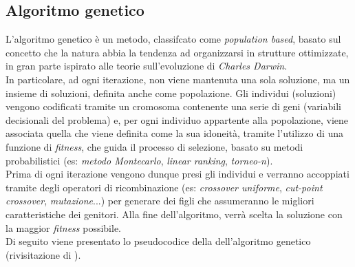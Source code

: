 \subsection{Algoritmo genetico}
\noindent L'algoritmo genetico \cite{site:dispense-de-giovanni} è un metodo, classifcato come \textit{population based}, basato sul concetto che la natura
abbia la tendenza ad organizzarsi in strutture ottimizzate, in gran parte ispirato
alle teorie sull'evoluzione di \textit{Charles Darwin}.\\
\noindent In particolare, ad ogni iterazione, non viene mantenuta una sola soluzione, ma un insieme di soluzioni, definita anche come popolazione.
Gli individui (soluzioni) vengono codificati tramite un cromosoma contenente una serie di geni (variabili decisionali del problema) e, per
ogni individuo appartente alla popolazione, viene associata quella che viene definita come la sua idoneità, tramite l'utilizzo di una
funzione di \textit{fitness}, che guida il processo di selezione, basato su metodi probabilistici (es: \textit{metodo Montecarlo}, \textit{linear ranking}, \textit{torneo-n}).\\
Prima di ogni iterazione vengono dunque presi gli individui e verranno accoppiati tramite degli operatori di ricombinazione
(es: \textit{crossover uniforme}, \textit{cut-point crossover}, \textit{mutazione}...)
per generare dei figli che assumeranno le migliori caratteristiche dei genitori. Alla fine dell'algoritmo, verrà scelta la soluzione con la maggior \textit{fitness} possibile.\\
Di seguito viene presentato lo pseudocodice della dell'algoritmo genetico (rivisitazione di \cite{site:solid-github}).
\vspace*{\fill}

